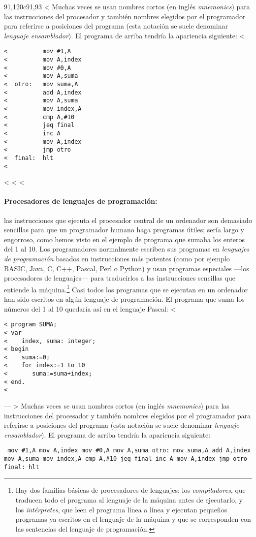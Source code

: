 91,120c91,93
< Muchas veces se usan nombres cortos (en inglés \emph{mnemonics}) para las instrucciones del procesador y también nombres elegidos por el programador para referirse a posiciones del programa (esta notación se suele denominar \emph{lenguaje ensamblador}). El programa de arriba tendría la apariencia siguiente: 
< \begin{verbatim} 
<          mov #1,A
<          mov A,index
<          mov #0,A
<          mov A,suma
<  otro:   mov suma,A
<          add A,index
<          mov A,suma
<          mov index,A
<          cmp A,#10
<          jeq final
<          inc A
<          mov A,index
<          jmp otro
<  final:  hlt
< \end{verbatim}
< 
< 
< \paragraph{Procesadores de lenguajes de programación:} las instrucciones que ejecuta el procesador central de un ordenador son demasiado sencillas para que un programador humano haga programas útiles; sería largo y engorroso, como hemos visto en el ejemplo de programa que sumaba los enteros del 1 al 10. Los programadores normalmente escriben sus programas en {\em lenguajes de programación} basados en instrucciones más potentes (como por ejemplo BASIC, Java, C, C++, Pascal, Perl o Python) y usan programas especiales ---los procesadores de lenguajes--- para traducirlos a las instrucciones sencillas que entiende la máquina.\footnote{Hay dos familias básicas de procesadores de lenguajes: los \emph{compiladores}, que traducen todo el programa al lenguaje de la máquina antes de ejecutarlo, y los \emph{intérpretes}, que leen el programa línea a línea y ejecutan pequeños programas ya escritos en el lenguaje de la máquina y que se corresponden con las sentencias del lenguaje de programación.} Casi todos los programas que se ejecutan en un ordenador han sido escritos en algún lenguaje de programación. El programa que suma los números del 1 al 10 quedaría así en el lenguaje Pascal: 
< \begin{verbatim}
< program SUMA;
< var
<    index, suma: integer;
< begin
<    suma:=0;
<    for index:=1 to 10
<       suma:=suma+index;
< end.
< \end{verbatim}
---
> Muchas veces se usan nombres cortos (en inglés \emph{mnemonics}) para las instrucciones del procesador y también nombres elegidos por el programador para referirse a posiciones del programa (esta notación se suele denominar \emph{lenguaje ensamblador}). El programa de arriba tendría la apariencia siguiente: \begin{verbatim} mov #1,A mov A,index mov #0,A mov A,suma otro: mov suma,A add A,index mov A,suma mov index,A cmp A,#10 jeq final inc A mov A,index jmp otro final: hlt \end{verbatim} 
